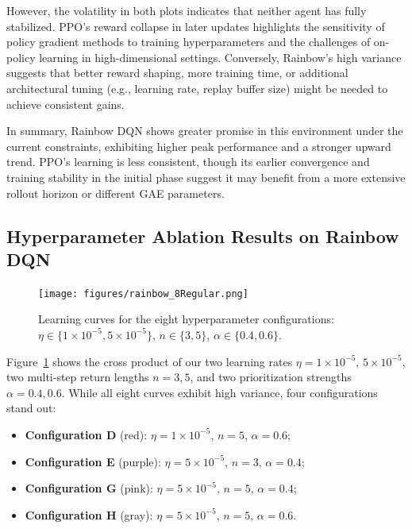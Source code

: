\documentclass{article}
\begin{document}
However, the volatility in both plots indicates that neither agent has fully stabilized. PPO’s reward collapse in later updates highlights the sensitivity of policy gradient methods to training hyperparameters and the challenges of on-policy learning in high-dimensional settings. Conversely, Rainbow’s high variance suggests that better reward shaping, more training time, or additional architectural tuning (e.g., learning rate, replay buffer size) might be needed to achieve consistent gains.

In summary, Rainbow DQN shows greater promise in this environment under the current constraints, exhibiting higher peak performance and a stronger upward trend. PPO’s learning is less consistent, though its earlier convergence and training stability in the initial phase suggest it may benefit from a more extensive rollout horizon or different GAE parameters.

\subsection{Hyperparameter Ablation Results on Rainbow DQN}

\begin{figure}[ht]
  \centering
  \texttt{[image: figures/rainbow\_8Regular.png]}
  \caption{Learning curves for the eight hyperparameter configurations:
           \(\eta\in\{1\times10^{-5},5\times10^{-5}\}\), 
           \(n\in\{3,5\}\), 
           \(\alpha\in\{0.4,0.6\}\).}
  \label{fig:ablation}
\end{figure}

Figure~\ref{fig:ablation} shows the cross product of our two learning rates \(\eta=1\times10^{-5},\,5\times10^{-5}\), two multi‐step return lengths \(n=3,5\), and two prioritization strengths \(\alpha=0.4,0.6\). While all eight curves exhibit high variance, four configurations stand out:

\begin{itemize}
  \item \textbf{Configuration D} (red): \(\eta=1\times10^{-5},\,n=5,\,\alpha=0.6\);
  \item \textbf{Configuration E} (purple): \(\eta=5\times10^{-5},\,n=3,\,\alpha=0.4\);
  \item \textbf{Configuration G} (pink): \(\eta=5\times10^{-5},\,n=5,\,\alpha=0.4\);
  \item \textbf{Configuration H} (gray): \(\eta=5\times10^{-5},\,n=5,\,\alpha=0.6\).
\end{itemize}
\end{document}
